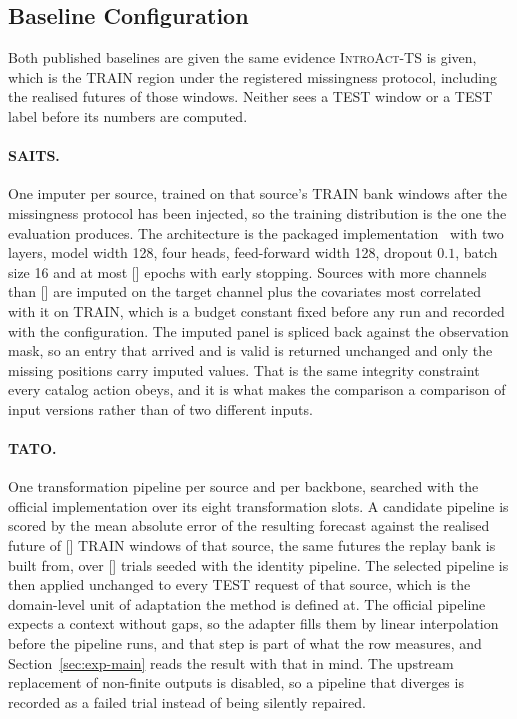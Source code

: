 \documentclass{article}
\newcommand{\ph}[1]{\textcolor{phgray}{\textsf{[\detokenize{#1}]}}}
\newcommand{\introact}{\textsc{IntroAct-TS}}
\begin{document}
\subsection{Baseline Configuration}
\label{app:baseline-config}
Both published baselines are given the same evidence \introact{} is given, which is the TRAIN
region under the registered missingness protocol, including the realised futures of those
windows. Neither sees a TEST window or a TEST label before its numbers are computed.

\paragraph{SAITS.} One imputer per source, trained on that source's TRAIN bank windows after
the missingness protocol has been injected, so the training distribution is the one the
evaluation produces. The architecture is the packaged implementation~\citep{du2023pypots} with
two layers, model width 128, four heads, feed-forward width 128, dropout $0.1$, batch size 16
and at most \ph{SAITS_EPOCHS} epochs with early stopping. Sources with more channels than
\ph{SAITS_MAXCH} are imputed on the target channel plus the covariates most correlated with it
on TRAIN, which is a budget constant fixed before any run and recorded with the configuration.
The imputed panel is spliced back against the observation mask, so an entry that arrived and is
valid is returned unchanged and only the missing positions carry imputed values. That is the
same integrity constraint every catalog action obeys, and it is what makes the comparison a
comparison of input versions rather than of two different inputs.

\paragraph{TATO.} One transformation pipeline per source and per backbone, searched with the
official implementation over its eight transformation slots. A candidate pipeline is scored by
the mean absolute error of the resulting forecast against the realised future of
\ph{TATO_WINDOWS} TRAIN windows of that source, the same futures the replay bank is built from,
over \ph{TATO_TRIALS} trials seeded with the identity pipeline. The selected pipeline is then
applied unchanged to every TEST request of that source, which is the domain-level unit of
adaptation the method is defined at. The official pipeline expects a context without gaps, so
the adapter fills them by linear interpolation before the pipeline runs, and that step is
part of what the row measures, and Section~\ref{sec:exp-main} reads the result with that in
mind. The upstream replacement of non-finite outputs is disabled, so a pipeline that diverges
is recorded as a failed trial instead of being silently repaired.
\end{document}
